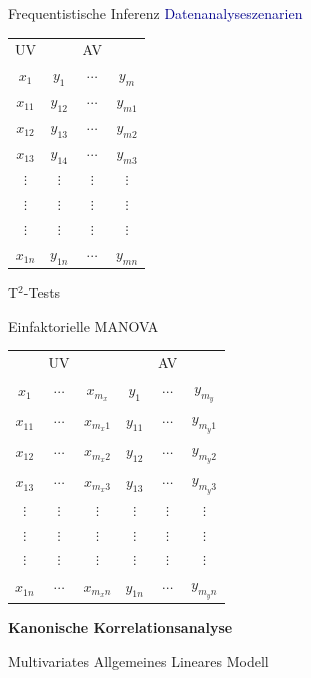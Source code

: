 \documentclass[
  8pt,
  ignorenonframetext,
]{beamer}
\begin{document}
\begin{frame}{Frequentistische Inferenz}
\protect\hypertarget{frequentistische-inferenz-2}{}
\textcolor{darkblue}{Datenanalyseszenarien} \vspace{4mm}

\small
\begin{minipage}{0.4\linewidth}
\center
\begin{tabular}{c|ccc}
UV        &          & AV        &             \\
$x_1$     & $y_1$    & $\cdots$  & $y_m$       \\\hline
$x_{11}$  & $y_{12}$ & $\cdots$  & $y_{m1}$    \\
$x_{12}$  & $y_{13}$ & $\cdots$  & $y_{m2}$    \\
$x_{13}$  & $y_{14}$ & $\cdots$  & $y_{m3}$    \\
$\vdots$  & $\vdots$ & $\vdots$  & $\vdots$    \\
$\vdots$  & $\vdots$ & $\vdots$  & $\vdots$    \\
$\vdots$  & $\vdots$ & $\vdots$  & $\vdots$    \\
$x_{1n}$  & $y_{1n}$ & $\cdots$  & $y_{mn}$    \\
\end{tabular}
\vspace{2mm}

T$^2$-Tests

Einfaktorielle MANOVA

\end{minipage}\hspace{2mm}
\begin{minipage}{0.6\linewidth}
\center
\begin{tabular}{ccc|ccc}
          & UV        &             &            & AV        &             \\
$x_1$     & $\cdots$  & $x_{m_x}$   & $y_1$      & $\cdots$  & $y_{m_y}$   \\\hline
$x_{11}$  & $\cdots$  & $x_{m_x1}$  & $y_{11}$   & $\cdots$  & $y_{m_y1}$  \\
$x_{12}$  & $\cdots$  & $x_{m_x2}$  & $y_{12}$   & $\cdots$  & $y_{m_y2}$  \\
$x_{13}$  & $\cdots$  & $x_{m_x3}$  & $y_{13}$   & $\cdots$  & $y_{m_y3}$  \\
$\vdots$  & $\vdots$  & $\vdots$    & $\vdots$   & $\vdots$  & $\vdots$    \\
$\vdots$  & $\vdots$  & $\vdots$    & $\vdots$   & $\vdots$  & $\vdots$    \\
$\vdots$  & $\vdots$  & $\vdots$    & $\vdots$   & $\vdots$  & $\vdots$    \\
$x_{1n}$  & $\cdots$  & $x_{m_xn}$  & $y_{1n}$   & $\cdots$  & $y_{m_yn}$  \\
\end{tabular}
\vspace{2mm}

\textbf{Kanonische Korrelationsanalyse}

Multivariates Allgemeines Lineares Modell
\end{minipage}
\end{frame}
\end{document}
